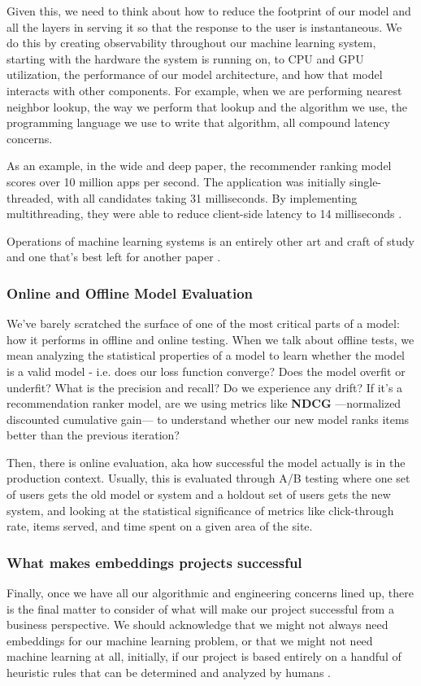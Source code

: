 \documentclass[11pt, table]{diazessay} %
\begin{document}
\begin{sloppypar}
Given this, we need to think about how to reduce the footprint of our model and all the layers in serving it so that the response to the user is instantaneous. We do this by creating observability throughout our machine learning system, starting with the hardware the system is running on, to CPU and GPU utilization, the performance of our model architecture, and how that model interacts with other components. For example, when we are performing nearest neighbor lookup, the way we perform that lookup and the algorithm we use, the programming language we use to write that algorithm, all compound latency concerns.  

As an example, in the wide and deep paper, the recommender ranking model scores over 10 million apps per second. The application was initially single-threaded, with all candidates taking 31 milliseconds. By implementing multithreading, they were able to reduce client-side latency to 14 milliseconds \citep{cheng2016wide}.

Operations of machine learning systems is an entirely other art and craft of study and one that's best left for another paper \citep{kreuzberger2022machine}.

\subsubsection{Online and Offline Model Evaluation}
We've barely scratched the surface of one of the most critical parts of a model: how it performs in offline and online testing. When we talk about offline tests, we mean analyzing the statistical properties of a model to learn whether the model is a valid model - i.e. does our loss function converge? Does the model overfit or underfit? What is the precision and recall? Do we experience any drift? If it's a recommendation ranker model, are we using metrics like \textbf{NDCG} ---normalized discounted cumulative gain--- to understand whether our new model ranks items better than the previous iteration?

Then, there is online evaluation, aka how successful the model actually is in the production context. Usually, this is evaluated through A/B testing where one set of users gets the old model or system and a holdout set of users gets the new system, and looking at the statistical significance of metrics like click-through rate, items served, and time spent on a given area of the site.

\subsubsection{What makes embeddings projects successful}
Finally, once we have all our algorithmic and engineering concerns lined up, there is the final matter to consider of what will make our project successful from a business perspective. We should acknowledge that we might not always need embeddings for our machine learning problem, or that we might not need machine learning at all, initially, if our project is based entirely on a handful of heuristic rules that can be determined and analyzed by humans \citep{zinkevich2017rules}.


\end{sloppypar}
\end{document}
